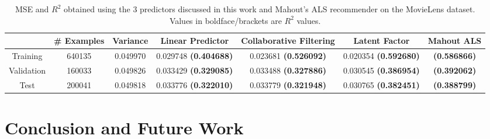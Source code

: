 \documentclass{acm_proc_article-sp}
\begin{document}
\begin{table*}
\centering
\begin{tabular}{|c|c|c|c|c|c|c|} \hline
& \# Examples & Variance & Linear Predictor & Collaborative Filtering & Latent Factor & Mahout ALS \\ \hline
Training & 640135 & 0.049970 & 0.029748 {\bf(0.404688)} & 0.023681 {\bf(0.526092)} & 0.020354 {\bf(0.592680)} & {\bf(0.586866)} \\ \hline
Validation & 160033 & 0.049826 & 0.033429 {\bf(0.329085)}  & 0.033488 {\bf(0.327886)} & 0.030545 {\bf(0.386954)} & {\bf(0.392062)} \\ \hline
Test & 200041 & 0.049818 & 0.033776 {\bf(0.322010)} & 0.033779 {\bf(0.321948)} & 0.030765 {\bf(0.382451)} & {\bf(0.388799)}\\ \hline
\end{tabular}
\caption{MSE and $R^2$ obtained using the 3 predictors discussed in this work and Mahout's ALS recommender on the MovieLens dataset. Values in boldface/brackets are $R^2$ values.}
\label{tableResults}
\end{table*}

\section{Conclusion and Future Work}



\end{document}
